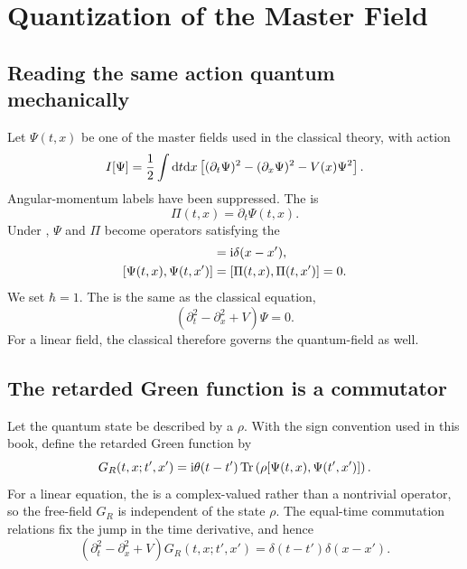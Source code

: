 \chapter{Quantization of the Master Field}
\label{chap:quantized-master-field}

\section{Reading the same action quantum mechanically}

Let $\Psi(t,x)$ be one of the master fields used in the classical theory, with action
\begin{equation}
I[\Psi]
=
\frac{1}{2}
\int \mathrm{d} t\mathrm{d} x
\left[
(\partial_t\Psi)^2
-(\partial_x\Psi)^2
-V(x)\Psi^2
\right].
\label{eq:quantum-master-action}
\end{equation}
Angular-momentum labels have been suppressed. The  is
\begin{equation}
\Pi(t,x)
=
\partial_t\Psi(t,x).
\end{equation}
Under , $\Psi$ and $\Pi$ become operators satisfying the 
\begin{align}
[\Psi(t,x),\Pi(t,x')]
&=
\rmi\delta(x-x'),
\label{eq:canonical-master-commutator}
\\
[\Psi(t,x),\Psi(t,x')]
&=
[\Pi(t,x),\Pi(t,x')]
=0.
\end{align}
We set $\hbar=1$. The  is the same as the classical equation,
\begin{equation}
\left(
\partial_t^2-\partial_x^2+V
\right)\Psi
=0.
\label{eq:quantized-master-eom}
\end{equation}
For a linear field, the classical  therefore governs the quantum-field  as well.

\section{The retarded Green function is a commutator}

Let the quantum state be described by a  $\rho$. With the sign convention used in this book, define the retarded Green function by
\begin{equation}
G_R(t,x;t',x')
=
\mathrm{i}\theta(t-t')
\operatorname{Tr}\left(
\rho[\Psi(t,x),\Psi(t',x')]
\right).
\label{eq:quantum-retarded-green}
\end{equation}
For a linear equation, the  is a complex-valued  rather than a nontrivial operator, so the free-field $G_R$ is independent of the state $\rho$. The equal-time commutation relations fix the jump in the time derivative, and hence
\begin{equation}
\left(
\partial_t^2-\partial_x^2+V
\right)G_R(t,x;t',x')
=
\delta(t-t')\delta(x-x').
\label{eq:retarded-green-quantum-eom}
\end{equation}

